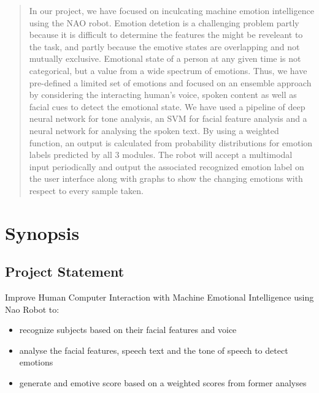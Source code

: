 \documentclass[oneside,a4paper,12pt]{report}
\begin{document}
\begin{normalsize}

\tableofcontents
\listoffigures 
\listoftables

\begin{abstract}
In our project, we have focused on inculcating machine emotion intelligence using the NAO robot. Emotion detetion is a challenging problem partly because it is difficult to determine the features the might be reveleant to the task, and partly because the emotive states are overlapping and not mutually exclusive. Emotional state of a person at any given time is not categorical, but a value from a wide spectrum of emotions. Thus, we have pre-defined a limited set of emotions and focused on an ensemble approach by considering the interacting human's voice, spoken content as well as facial cues to detect the emotional state. We have used a pipeline of deep neural network for tone analysis, an SVM for facial feature analysis and a neural network for analysing the spoken text. By using a weighted function, an output is calculated from probability distributions for emotion labels predicted by all 3 modules. The robot will accept a multimodal input periodically and output the associated recognized emotion label on the user interface along with graphs to show the changing emotions with respect to every sample taken.
\end{abstract}


\chapter{Synopsis}

\section{Project Statement}
Improve Human Computer Interaction with Machine Emotional Intelligence using Nao Robot to: 
\begin{itemize}
\item recognize subjects based on their facial features and voice
\item analyse the facial features, speech text and the tone of speech to detect emotions
\item generate and emotive score based on a weighted scores from former analyses
\end{itemize}
\noindent
\vspace{0,2 in}


\end{normalsize}
\end{document}
